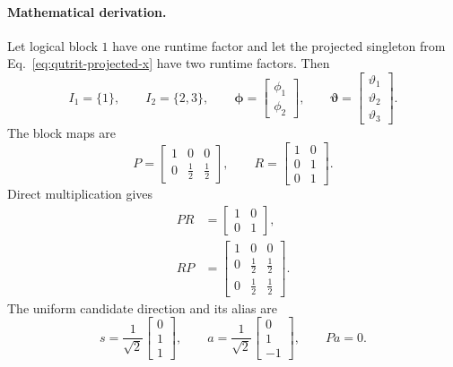 \documentclass[10pt,twocolumn]{article}
\newcommand{\mathderiv}{\paragraph{Mathematical derivation.}}
\begin{document}
\mathderiv Let logical block \(1\) have one runtime factor and let the projected
singleton from Eq.~\eqref{eq:qutrit-projected-x} have two runtime factors.
Then
\begin{equation}
I_1=\{1\},\qquad I_2=\{2,3\},\qquad
\bm\phi=\begin{bmatrix}\phi_1\\\phi_2\end{bmatrix},\qquad
\bm\vartheta=\begin{bmatrix}\vartheta_1\\\vartheta_2\\\vartheta_3\end{bmatrix}.
\label{eq:toy-blocks}
\end{equation}
The block maps are
\begin{equation}
P=
\begin{bmatrix}
1&0&0\\
0&\tfrac12&\tfrac12
\end{bmatrix},\qquad
R=
\begin{bmatrix}
1&0\\
0&1\\
0&1
\end{bmatrix}.
\label{eq:toy-pr}
\end{equation}
Direct multiplication gives
\begin{align}
PR&=
\begin{bmatrix}1&0\\0&1\end{bmatrix},\nonumber\\
RP&=
\begin{bmatrix}
1&0&0\\
0&\tfrac12&\tfrac12\\
0&\tfrac12&\tfrac12
\end{bmatrix}.
\label{eq:toy-projector}
\end{align}
The uniform candidate direction and its alias are
\begin{equation}
s=\frac1{\sqrt2}\begin{bmatrix}0\\1\\1\end{bmatrix},\qquad
a=\frac1{\sqrt2}\begin{bmatrix}0\\1\\-1\end{bmatrix},\qquad
Pa=0.
\label{eq:toy-uniform-alias}
\end{equation}
\end{document}
